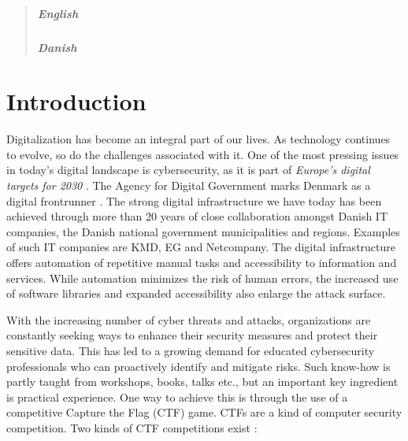 \begin{abstract}
\paragraph{English}

\paragraph{Danish}
\end{abstract}


{ \hypersetup{hidelinks} \tableofcontents {}}

\newpage
{}
\setcounter{page}{1}

\chapter{Introduction}
Digitalization has become an integral part of our lives. As technology continues to evolve, so do the challenges associated with it. One of the most pressing issues in today's digital landscape is cybersecurity, as it is part of \textit{Europe's digital targets for 2030} \Parencite{europe_digital_decade}. The Agency for Digital Government marks Denmark as a digital frontrunner \Parencite{danish_digital_journey}. The strong digital infrastructure we have today has been achieved through more than 20 years of close collaboration amongst Danish IT companies, the Danish national government municipalities and regions. Examples of such IT companies are KMD, EG and Netcompany. The digital infrastructure offers automation of repetitive manual tasks and accessibility to information and services. While automation minimizes the risk of human errors, the increased use of software libraries and expanded accessibility also enlarge the attack surface.

With the increasing number of cyber threats and attacks, organizations are constantly seeking ways to enhance their security measures and protect their sensitive data. This has led to a growing demand for educated cybersecurity professionals who can proactively identify and mitigate risks. Such know-how is partly taught from workshops, books, talks etc., but an important key ingredient is practical experience. One way to achieve this is through the use of a competitive Capture the Flag (CTF) game. CTFs are a kind of computer security competition. Two kinds of CTF competitions exist \Parencite{ctf_overview}: 

